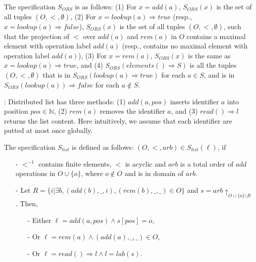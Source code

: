The specification $S_{\mathit{ORS}}$ is as follows: (1) For $x=add(a)$, $S_{\mathit{ORS}}(x)$ is the set of all tuples $(O,<,\emptyset)$, (2) For $x=lookup(a) \Rightarrow \mathit{true}$ (resp., $x=lookup(a) \Rightarrow \mathit{false}$), $S_{\mathit{ORS}}(x)$ is the set of all tuples $(O,<,\emptyset)$, such that the projection of $<$ over $add(a)$ and $rem(a)$ in $O$ contains a maximal element with operation label $add(a)$ (resp., contains no maximal element with operation label $add(a)$), (3) For $x = rem(a)$, $S_{\mathit{ORS}}(x)$ is the same as $x = lookup(a) \Rightarrow \mathit{true}$, and (4) $S_{\mathit{ORS}}(elements() \Rightarrow S)$ is all the tuples $(O,<,\emptyset)$ that is in $S_{\mathit{ORS}}(lookup(a) \Rightarrow \mathit{true})$ for each $a \in S$, and is in $S_{\mathit{ORS}}(lookup(a)) \Rightarrow \mathit{false}$ for each $a \notin S$. 

: Distributed list has three methods: (1) $add(a,pos)$ inserts identifier $a$ into position $pos \in \mathbb{N}$, (2) $rem(a)$ removes the identifier $a$, and (3) $read() \Rightarrow l$ returns the list content. Here intuitively, we assume that each identifier are putted at most once globally.

The specification $S_{\mathit{list}}$ is defined as follows: $(O,<,\mathit{arb}) \in S_{\mathit{list}}(\ell)$, if

\begin{itemize}
\setlength{\itemsep}{0.5pt}
\item[-] $<^{-1}$ contains finite elements, $<$ is acyclic and $arb$ is a total order of $add$ operations in $O \cup \{ o \}$, where $o \notin O$ and is in domain of $arb$.

\item[-] Let $R = \{ i \vert \exists b, (add(b),\_,i),(rem(b),\_,\_) \in O \}$ and $s = \mathit{arb} \uparrow_{ O \cup \{ o \} \setminus R }$. Then,

    \begin{itemize}
    \setlength{\itemsep}{0.5pt}
    \item[-] Either $\ell = add(a,pos) \wedge s[pos] = o$,

    \item[-] Or $\ell = rem(a) \wedge (add(a),\_,\_) \in O$,

    \item[-] Or $\ell = read() \Rightarrow l \wedge l = lab(s)$.
    \end{itemize}
\end{itemize}


